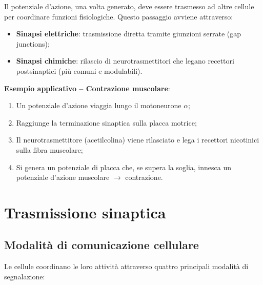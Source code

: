 \documentclass[11pt,a4paper,italian,twoside]{report}
\theoremstyle{definition} %
\begin{document}
Il potenziale d'azione, una volta generato, deve essere trasmesso ad altre cellule per coordinare funzioni fisiologiche. Questo passaggio avviene attraverso:
\begin{itemize}
  \item \textbf{Sinapsi elettriche}: trasmissione diretta tramite giunzioni serrate (gap junctions);
  \item \textbf{Sinapsi chimiche}: rilascio di neurotrasmettitori che legano recettori postsinaptici (più comuni e modulabili).
\end{itemize}

\begin{esempio}
\textbf{Esempio applicativo – Contrazione muscolare}:
\begin{enumerate}
  \item Un potenziale d'azione viaggia lungo il motoneurone $\alpha$;
  \item Raggiunge la terminazione sinaptica sulla placca motrice;
  \item Il neurotrasmettitore (acetilcolina) viene rilasciato e lega i recettori nicotinici sulla fibra muscolare;
  \item Si genera un potenziale di placca che, se supera la soglia, innesca un potenziale d'azione muscolare $\rightarrow$ contrazione.
\end{enumerate}
\end{esempio}


\chapter{Trasmissione sinaptica}
\label{chap:trasmissione_sinaptica}

\section{Modalità di comunicazione cellulare}
\label{sec:comunicazione_cellulare}

Le cellule coordinano le loro attività attraverso quattro principali modalità di segnalazione:
\end{document}
